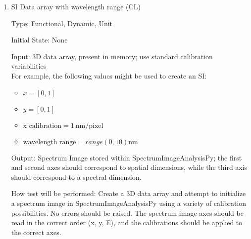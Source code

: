 \documentclass[12pt, titlepage]{article}
\newcommand{\progname}{SpectrumImageAnalysisPy}
\begin{document}
\begin{enumerate}
Input: 3D data array, present in memory; use standard calibration variabilities\\
For example, the following values might be used to create an SI: 
\begin{itemize}
	\item $x = [0, 1]$
	\item $y = [0, 1]$
	\item $\text{x calibration} = 1\ \si{\nano\metre}/\text{pixel}$
	\item $\text{dispersion} = 0.01\ \si{\electronvolt}/\text{pixel}$
	\item $E(0) = -2 \si{\electronvolt}$
\end{itemize}

Output: Spectrum Image stored within \progname{}; the first and second axes should correspond to spatial dimensions, while the third axis should correspond to a spectral dimension.

How test will be performed: Create a 3D data array and attempt to initialize a spectrum image in \progname{} using a variety of calibration possibilities. No errors should be raised. The spectrum image axes should be read in the correct order (x, y, E), and the calibrations should be applied to the correct axes.


\item{SI Data array with wavelength range (CL)}

Type: Functional, Dynamic, Unit

Initial State: None

Input: 3D data array, present in memory; use standard calibration variabilities\\
For example, the following values might be used to create an SI: 
\begin{itemize}
	\item $x = [0, 1]$
	\item $y = [0, 1]$
	\item $\text{x calibration} = 1\ \si{\nano\metre}/\text{pixel}$
	\item $\text{wavelength range} = range(0, 10) \si{\nano\metre}$
\end{itemize}

Output: Spectrum Image stored within \progname{}; the first and second axes should correspond to spatial dimensions, while the third axis should correspond to a spectral dimension.

How test will be performed: Create a 3D data array and attempt to initialize a spectrum image in \progname{} using a variety of calibration possibilities. No errors should be raised. The spectrum image axes should be read in the correct order (x, y, E), and the calibrations should be applied to the correct axes.



\end{enumerate}
\end{document}
